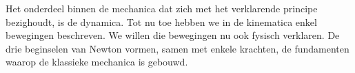 \documentclass{ximera}
\begin{document}
	\author{Bart Lambregs}
    \xmsource\xmuitleg


Het onderdeel binnen de mechanica dat zich met het verklarende principe bezighoudt, is de dynamica. Tot nu toe hebben we in de kinematica enkel bewegingen beschreven. We willen die bewegingen nu ook fysisch verklaren. De drie beginselen van Newton vormen, samen met enkele krachten, de fundamenten waarop de klassieke mechanica is gebouwd. 
	
\end{document}

